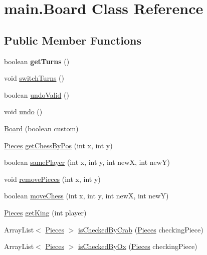 \hypertarget{classmain_1_1_board}{}\section{main.\+Board Class Reference}
\label{classmain_1_1_board}
\subsection*{Public Member Functions}
\begin{DoxyCompactItemize}
\item 
\mbox{\label{classmain_1_1_board_aad7eb5429a65bcf5acb31b8032844833}} 
boolean {\bfseries get\+Turns} ()
\item 
void \mbox{\hyperlink{classmain_1_1_board_a0b46a67725aeeab8d69ddb03735e14a0}{switch\+Turns}} ()
\item 
boolean \mbox{\hyperlink{classmain_1_1_board_ad4a1b505aa20498394a5905069e0dae6}{undo\+Valid}} ()
\item 
void \mbox{\hyperlink{classmain_1_1_board_a31c0049120e44edd6bf7d51ded24a513}{undo}} ()
\item 
\mbox{\hyperlink{classmain_1_1_board_a76177c2c47c5a55f8027c511d0e1e6d2}{Board}} (boolean custom)
\item 
\mbox{\hyperlink{classmain_1_1_pieces}{Pieces}} \mbox{\hyperlink{classmain_1_1_board_a5c13bad815e095818515980a72f947a2}{get\+Chess\+By\+Pos}} (int x, int y)
\item 
boolean \mbox{\hyperlink{classmain_1_1_board_a8f84ad933ed08f44884209463be292b9}{same\+Player}} (int x, int y, int newX, int newY)
\item 
void \mbox{\hyperlink{classmain_1_1_board_a109f71de0ac5ff2d94814d6332f01d57}{remove\+Pieces}} (int x, int y)
\item 
boolean \mbox{\hyperlink{classmain_1_1_board_a6d724e617f4f3fbef0f53ea3e36011d0}{move\+Chess}} (int x, int y, int newX, int newY)
\item 
\mbox{\hyperlink{classmain_1_1_pieces}{Pieces}} \mbox{\hyperlink{classmain_1_1_board_a46026803c3c65d8e3cbadc70938f2f90}{get\+King}} (int player)
\item 
Array\+List$<$ \mbox{\hyperlink{classmain_1_1_pieces}{Pieces}} $>$ \mbox{\hyperlink{classmain_1_1_board_a2eeeef4c31734edf9ce59fe06e5821bd}{is\+Checked\+By\+Crab}} (\mbox{\hyperlink{classmain_1_1_pieces}{Pieces}} checking\+Piece)
\item 
Array\+List$<$ \mbox{\hyperlink{classmain_1_1_pieces}{Pieces}} $>$ \mbox{\hyperlink{classmain_1_1_board_a701432c0e3bfdabf18f7251f585fe709}{is\+Checked\+By\+Ox}} (\mbox{\hyperlink{classmain_1_1_pieces}{Pieces}} checking\+Piece)

\end{DoxyCompactItemize}
